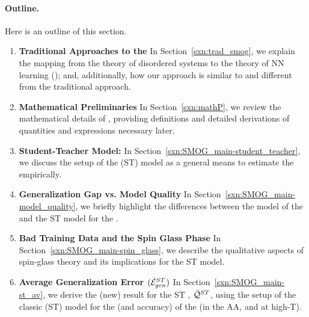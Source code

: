 \paragraph{Outline.}
Here is an outline of this section.
\begin{enumerate}[label=4.\arabic*]
\item
  \textbf{Traditional Approaches to the \SMOG}
  In Section~\ref{sxn:trad_smog}, we explain the mapping from the \STATMECH theory of disordered systems
    to the \STATMECH theory of NN learning (\SMOG); and, additionally, how our \SemiEmpirical approach
    is similar to and different from the traditional approach.

  \item
      \textbf{Mathematical Preliminaries}
    In Section~\ref{sxn:mathP}, we review the mathematical details of \STATMECH, providing definitions
      and detailed derivations of quantities and expressions necessary later.  

    \item
        \textbf{Student-Teacher Model:}
      In Section~\ref{sxn:SMOG_main-student_teacher}, we discuss the setup of the \StudentTeacher (ST) model
    as a general means to estimate the \AverageGeneralizationError empirically.  

  \item
      \textbf{Generalization Gap vs. Model Quality}
    In Section~\ref{sxn:SMOG_main-model_quality}, we briefly highlight the differences between the \STATMECH model
    of the \GeneralizationAccuracy and the ST model for the \GeneralizationGap.

  \item
      \textbf{Bad Training Data and the Spin Glass Phase}
    In Section~\ref{sxn:SMOG_main-spin_glass}, we describe the qualitative aspects of spin-glass theory
    and its implications for the ST model.

  \item
      \textbf{Average Generalization Error $(\bar{\mathcal{E}}^{ST}_{gen})$}
    In Section~\ref{sxn:SMOG_main-st_av}, we derive the (new) result for the
    ST \ModelQuality, $\bar{\mathcal{Q}}^{ST}$, using the setup of the classic (ST) model for the
    \GeneralizationError (and accuracy) of the \Perceptron (in the AA, and at high-T).
\end{enumerate}

